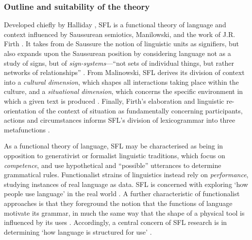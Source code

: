 	  \subsubsection{Outline and suitability of the theory}

	  Developed chiefly by Halliday \citeyear{halliday_language_1994,halliday_introduction_2004}, SFL is a functional theory of language and context influenced by Saussurean semiotics, Manilowski, and the work of J.R. Firth \cite{halliday_language_1989}. It takes from de Saussure the notion of linguistic units as signifiers, but also expands upon the Saussurean position by considering language not as a study of signs, but of \emph{sign-systems}---``not sets of individual things, but rather networks of relationships'' \cite[p.~4]{halliday_language_1989}. From Malinowski, SFL derives its division of context into a \emph{cultural dimension}, which shapes all interactions taking place within the culture, and a \emph{situational dimension}, which concerns the specific environment in which a given text is produced \cite[p.~6]{halliday_language_1989}. Finally, Firth's elaboration and linguistic re-orientation of the context of situation as fundamentally concerning participants, actions and circumstances informs SFL's division of lexicogrammar into three metafunctions \cite[p.~8]{halliday_language_1989}.



	  As a functional theory of language, SFL may be characterised as being in opposition to generativist or formalist linguistic traditions, which focus on \emph{competence}, and use hypothetical and ``possible'' utterances to determine grammatical rules. Functionalist strains of linguistics instead rely on \emph{performance}, studying instances of real language as data. SFL is concerned with exploring `how people use language' in the real world \cite[p.~2]{eggins_introduction_2004}. A further characteristic of functionalist approaches is that they foreground the notion that the functions of language motivate its grammar, in much the same way that the shape of a physical tool is influenced by its uses \cite{nichols_functional_1984}. Accordingly, a central concern of SFL research is in determining `how language is structured for use' \cite[p.~2]{eggins_introduction_2004}. 

